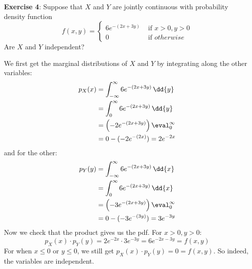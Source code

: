 \documentclass{article}
\begin{document}
\textbf{Exercise 4}: Suppose that $X$ and $Y$ are jointly continuous with probability density function 
    \begin{equation*}
        f(x, y) = \begin{cases}
            6e^{-(2x + 3y)} &\text{ if } x > 0, y > 0 \\
            0 &\text{ if }  otherwise        
        \end{cases}
    \end{equation*}
Are $X$ and $Y$ independent?
    \begin{answer}
        We first get the marginal distributions of $X$ and $Y$ by integrating along the other variables:
            \begin{align*}
                p_{X}(x) &= \int_{-\infty}^{\infty} 6e^{-(2x + 3y)} \, \dd{y} \\
                &= \int_{0}^{\infty} 6e^{-(2x + 3y)} \, \dd{y} \\
                &= \left(-2e^{-(2x + 3y)}\right)\eval_{0}^{\infty} \\
                &= 0 - (-2e^{-(2x)}) = 2e^{-2x}
            \end{align*}
        and for the other:
            \begin{align*}
                p_{Y}(y) &= \int_{-\infty}^{\infty} 6e^{-(2x + 3y)} \, \dd{x}  \\
                         &= \int_{0}^{\infty} 6e^{-(2x + 3y)} \, \dd{x}        \\
                         &= \left(-3e^{-(2x + 3y)}\right)\eval_{0}^{\infty}    \\
                         &= 0 - (-3e^{-(3y)}) = 3e^{-3y}                         
            \end{align*}
        Now we check that the product gives us the pdf. For $x > 0, y > 0$:
            \begin{equation*}
                p_{X}(x) \cdot p_{Y}(y) = 2e^{-2x} \cdot 3e^{-3y} = 6e^{-2x - 3y} = f(x, y)
            \end{equation*}
        For when $x \leq 0$ or $y \leq 0$, we still get $p_{X}(x) \cdot p_{Y}(y) = 0 = f(x, y)$. So indeed, the variables are independent.
    \end{answer}

\newpage
\end{document}
